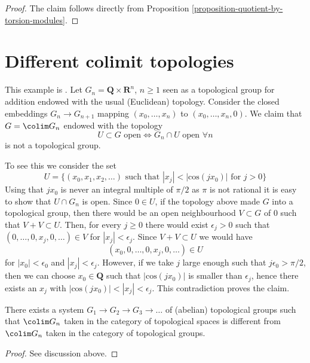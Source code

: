 \begin{proof}
The claim follows directly from
Proposition \ref{proposition-quotient-by-torsion-modules}.
\end{proof}




\section{Different colimit topologies}
\label{section-colimit-topology}

\noindent
This example is \cite[Example 1.2, page 553]{TSH}. Let
$G_n = \mathbf{Q} \times \mathbf{R}^n$, $n \geq 1$ seen as a topological group
for addition endowed with the usual (Euclidean) topology. Consider the closed
embeddings $G_n \to G_{n + 1}$ mapping $(x_0, \ldots, x_n)$ to
$(x_0, \ldots, x_n, 0)$. We claim that $G = \colim G_n$ endowed with the
topology
$$
U \subset G\text{ open} \Leftrightarrow G_n \cap U\text{ open }\forall n
$$
is not a topological group.

\medskip\noindent
To see this we consider the set
$$
U = \{(x_0, x_1, x_2, \ldots)\text{ such that }
|x_j| < |\text{cos}(jx_0)| \text{ for } j > 0\}
$$
Using that $jx_0$ is never an integral multiple of $\pi/2$ as $\pi$
is not rational it is easy to show that $U \cap G_n$ is open. Since
$0 \in U$, if the topology above made $G$ into a topological group,
then there would be an open neighbourhood $V \subset G$ of $0$
such that $V + V \subset U$. Then, for every $j \geq 0$ there would
exist $\epsilon_j > 0$ such that $(0, \ldots, 0, x_j, 0, \ldots) \in V$
for $|x_j| < \epsilon_j$. Since $V + V \subset U$ we would have
$$
(x_0, 0, \ldots, 0, x_j, 0, \ldots) \in U
$$
for $|x_0| < \epsilon_0$ and $|x_j| < \epsilon_j$. However, if we
take $j$ large enough such that $j \epsilon_0 > \pi/2$, then we can
choose $x_0 \in \mathbf{Q}$ such that $|\text{cos}(jx_0)|$ is smaller than
$\epsilon_j$, hence there exists an $x_j$ with
$|\text{cos}(jx_0)| < |x_j| < \epsilon_j$. This contradiction proves the claim.

\begin{lemma}
\label{lemma-colimit-topology}
There exists a system $G_1 \to G_2 \to G_3 \to \ldots$ of (abelian)
topological groups such that $\colim G_n$ taken in the category of
topological spaces is different from $\colim G_n$ taken in the category
of topological groups.
\end{lemma}

\begin{proof}
See discussion above.
\end{proof}






